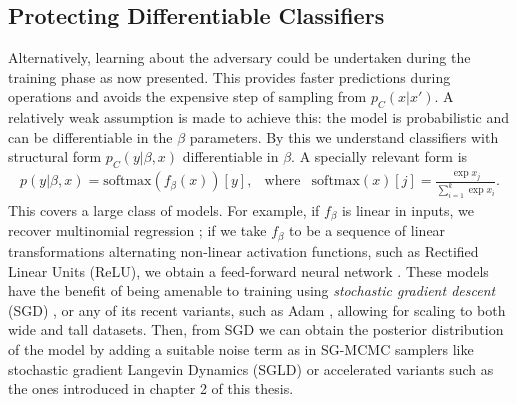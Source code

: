  
 
 \subsection{Protecting Differentiable Classifiers}\label{sec:uncs}
 
Alternatively, learning about the adversary 
could be undertaken during the training phase as now 
presented. This provides faster predictions during operations and avoids the expensive step of sampling from $p_C(x \vert x')$.
A relatively weak assumption is made to achieve this: 
the model is probabilistic and can be differentiable in the $\beta$ parameters.
By this we understand classifiers with structural form 
$p_C(y|\beta,x)$ differentiable in $\beta$. 
A specially relevant form %
is 
%
\begin{eqnarray}\label{TGF}
p(y|\beta, x) = \mbox{softmax} (f_\beta (x))[y], & \text{where} & \mbox{softmax}(x)[j] = \frac{\exp{x_j}}{\sum_{i=1}^k \exp{x_i} }. 
\end{eqnarray}
%
This covers a large class of models. For example,
if $f_\beta$ is linear in inputs, %
we recover multinomial regression 
\parencite{mccullagh1989generalized}; if we take $f_\beta$ to be a sequence of linear transformations alternating non-linear activation functions, such as Rectified Linear Units (ReLU), we obtain a feed-forward neural network \parencite{10.5555/3086952}. 
These models have the benefit of being amenable to training using \emph{stochastic gradient descent} (SGD) \parencite{bottou2010large},
or any of its recent variants, such as Adam \parencite{kingma2014adam}, 
allowing for scaling to both wide and tall datasets. Then, from SGD we can obtain the posterior distribution of the model by adding a suitable noise term as in SG-MCMC samplers like stochastic gradient Langevin Dynamics (SGLD) \parencite{welling2011bayesian} or accelerated variants such as the ones introduced in chapter 2 of this thesis.


